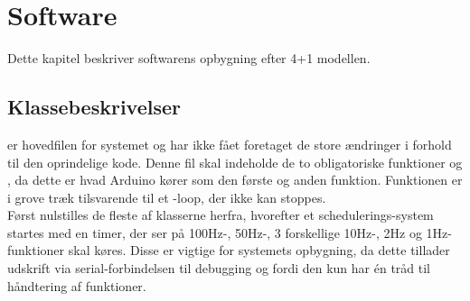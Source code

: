 \documentclass[Main]{subfiles}
\begin{document}
\chapter{Software}
Dette kapitel beskriver softwarens opbygning efter 4+1 modellen. 

\section{Klassebeskrivelser}

 er hovedfilen for systemet og har ikke fået foretaget de store ændringer i forhold til den oprindelige kode.
Denne fil skal indeholde de to obligatoriske funktioner  og , da dette er hvad Arduino kører som den første og anden funktion.
Funktionen  er i grove træk tilsvarende til et -loop, der ikke kan stoppes.
\\
Først nulstilles de fleste af klasserne herfra, hvorefter et schedulerings-system startes med en timer, der ser på 100Hz-, 50Hz-, 3 forskellige 10Hz-, 2Hz og 1Hz-funktioner skal køres. 
Disse er vigtige for systemets opbygning, da dette tillader udskrift via serial-forbindelsen til debugging og fordi den kun har én tråd til håndtering af funktioner.

\begin{Function}
\end{Function}


\begin{Function}
\end{Function}


\begin{Function}
\end{Function}
\end{document}
